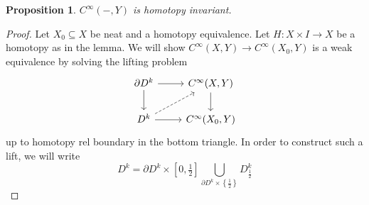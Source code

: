 \documentclass{article}
\newtheorem{proposition}[theorem]{Proposition}
\newtheorem{proposed work}[theorem]{Proposed Work}
\begin{document}
\begin{proposition}
  $C^\infty(-,Y)$ is homotopy invariant.
\end{proposition}
\begin{proof}
  Let $X_0\subseteq X$ be neat and a homotopy equivalence.
Let $H:X\times I\to X$ be a homotopy as in the lemma.
We will show $C^\infty(X,Y)\to C^\infty(X_0,Y)$ is a weak equivalence by solving the lifting problem
\[
  \begin{tikzcd}
    \partial D^k\arrow[r]\arrow[d] & C^\infty(X,Y)\arrow[d]\\
    D^k\arrow[r]\arrow[ur,dashed] & C^\infty(X_0,Y)
  \end{tikzcd}
\]
up to homotopy rel boundary in the bottom triangle. In order to construct such a lift, we will write
\[
  D^k = \partial D^k\times \left[0,\tfrac12\right]\bigcup_{\partial D^k\times\left\{\tfrac12\right\}}D^k_{\tfrac12}
\]


\end{proof}
\end{document}
